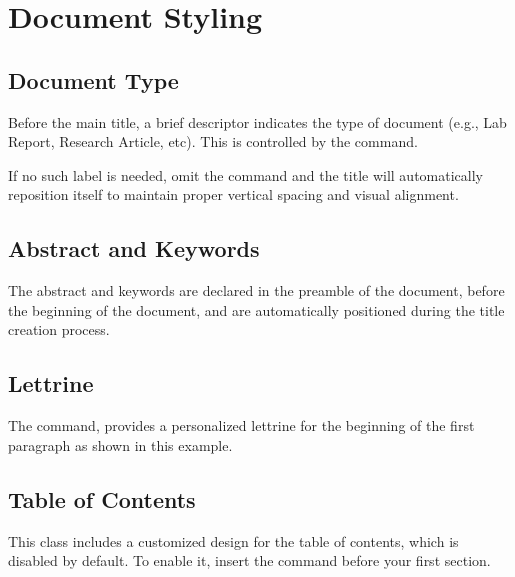 \section{Document Styling}

    \subsection{Document Type}

        Before the main title, a brief descriptor indicates the type of document (e.g., Lab Report, Research Article, etc). This is controlled by the \inlinecode{\doctype{}} command. 
        
        If no such label is needed, omit the command and the title will automatically reposition itself to maintain proper vertical spacing and visual alignment.

    \subsection{Abstract and Keywords}

        The abstract and keywords are declared in the preamble of the document, before the beginning of the document, and are automatically positioned during the title creation process.

    \subsection{Lettrine}

		The \inlinecode{\taustart{}} command, provides a personalized lettrine for the beginning of the first paragraph as shown in this example.

	\subsection{Table of Contents}

        This class includes a customized design for the table of contents, which is disabled by default. To enable it, insert the \inlinecode{\tableofcontents} command before your first section.


